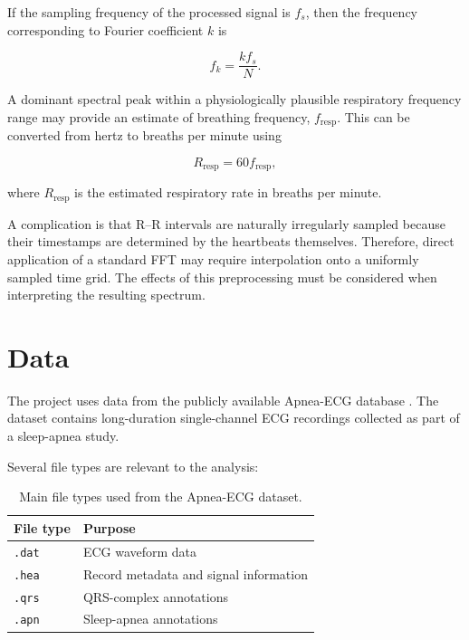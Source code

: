 If the sampling frequency of the processed signal is $f_s$, then the
frequency corresponding to Fourier coefficient $k$ is

\begin{equation}
f_k = \frac{k f_s}{N}.
\label{eq:frequency_bins}
\end{equation}

A dominant spectral peak within a physiologically plausible respiratory
frequency range may provide an estimate of breathing frequency,
$f_{\mathrm{resp}}$. This can be converted from hertz to breaths per minute
using

\begin{equation}
R_{\mathrm{resp}}
=
60 f_{\mathrm{resp}},
\label{eq:resp_rate}
\end{equation}

where $R_{\mathrm{resp}}$ is the estimated respiratory rate in breaths per
minute.

A complication is that R--R intervals are naturally irregularly sampled
because their timestamps are determined by the heartbeats themselves.
Therefore, direct application of a standard FFT may require interpolation
onto a uniformly sampled time grid. The effects of this preprocessing must
be considered when interpreting the resulting spectrum.


\section{Data}
\label{sec:data}

The project uses data from the publicly available Apnea-ECG database
\cite{penzel2000}. The dataset contains long-duration single-channel ECG
recordings collected as part of a sleep-apnea study.

Several file types are relevant to the analysis:

\begin{table}[h!]
\centering
\begin{tabular}{ll}
\hline
\textbf{File type} & \textbf{Purpose} \\
\hline
\texttt{.dat} & ECG waveform data \\
\texttt{.hea} & Record metadata and signal information \\
\texttt{.qrs} & QRS-complex annotations \\
\texttt{.apn} & Sleep-apnea annotations \\
\hline
\end{tabular}
\caption{Main file types used from the Apnea-ECG dataset.}
\label{tab:file_types}
\end{table}

